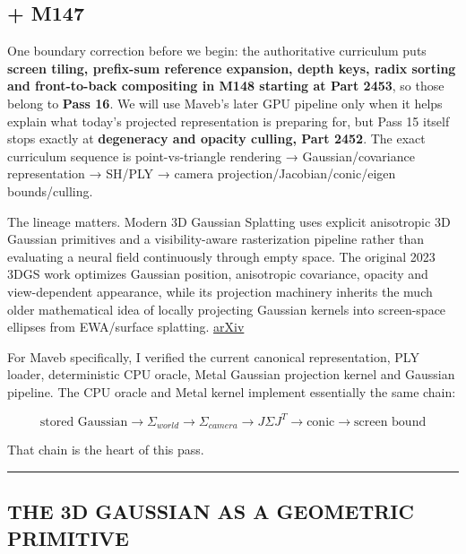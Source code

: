 \subsection{+ M147}\label{04-visual-computing-ii-ch037-m147}

One boundary correction before we begin: the authoritative curriculum puts \textbf{screen tiling, prefix-sum reference expansion, depth keys, radix sorting and front-to-back compositing in M148 starting at Part 2453}, so those belong to \textbf{Pass 16}. We will use Maveb's later GPU pipeline only when it helps explain what today's projected representation is preparing for, but Pass 15 itself stops exactly at \textbf{degeneracy and opacity culling, Part 2452}. The exact curriculum sequence is point-vs-triangle rendering → Gaussian/covariance representation → SH/PLY → camera projection/Jacobian/conic/eigen bounds/culling.

The lineage matters. Modern 3D Gaussian Splatting uses explicit anisotropic 3D Gaussian primitives and a visibility-aware rasterization pipeline rather than evaluating a neural field continuously through empty space. The original 2023 3DGS work optimizes Gaussian position, anisotropic covariance, opacity and view-dependent appearance, while its projection machinery inherits the much older mathematical idea of locally projecting Gaussian kernels into screen-space ellipses from EWA/surface splatting. \href{https://arxiv.org/abs/2308.04079?utm_source=chatgpt.com}{arXiv}

For Maveb specifically, I verified the current canonical representation, PLY loader, deterministic CPU oracle, Metal Gaussian projection kernel and Gaussian pipeline. The CPU oracle and Metal kernel implement essentially the same chain:

\[
\boxed{
\text{stored Gaussian}
\rightarrow
\Sigma_{world}
\rightarrow
\Sigma_{camera}
\rightarrow
J\Sigma J^T
\rightarrow
\text{conic}
\rightarrow
\text{screen bound}
}
\]

That chain is the heart of this pass.

\begin{center}\rule{0.5\linewidth}{0.5pt}\end{center}

\subsection{THE 3D GAUSSIAN AS A GEOMETRIC PRIMITIVE}\label{04-visual-computing-ii-ch037-the-3d-gaussian-as-a-geometric-primitive}

